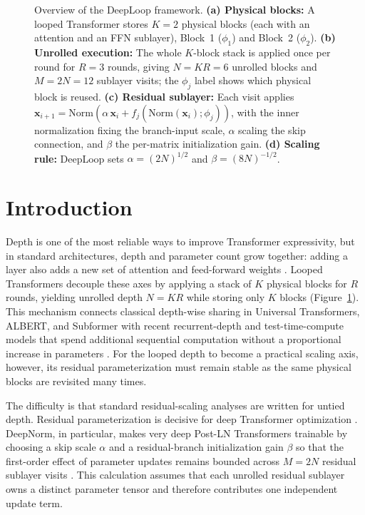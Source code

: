 \documentclass[11pt]{airesearch}
\begin{document}
\begin{figure}[t]
  \centering
  
  \caption{Overview of the DeepLoop framework.
    \textbf{(a) Physical blocks:} A looped Transformer stores $K{=}2$
    physical blocks (each with an attention and an FFN sublayer),
    Block~1 ($\phi_1$) and Block~2 ($\phi_2$).
    \textbf{(b) Unrolled execution:} The whole $K$-block stack is applied
    once per round for $R{=}3$ rounds, giving $N{=}KR{=}6$ unrolled
    blocks and $M{=}2N{=}12$ sublayer visits; the $\phi_j$ label shows
    which physical block is reused.
    \textbf{(c) Residual sublayer:} Each visit applies
    $\mathbf{x}_{i+1}{=}\mathrm{Norm}(\alpha\,\mathbf{x}_i
    + f_j(\mathrm{Norm}(\mathbf{x}_i);\phi_j))$, with the inner
    normalization fixing the branch-input scale, $\alpha$ scaling the skip
    connection, and $\beta$ the per-matrix initialization gain.
    \textbf{(d) Scaling rule:} DeepLoop sets $\alpha{=}(2N)^{1/2}$ and
    $\beta{=}(8N)^{-1/2}$.}
  \label{fig:deeploop-overview}
\end{figure}

\section{Introduction}

Depth is one of the most reliable ways to improve Transformer expressivity, but in standard architectures, depth and parameter count grow together: adding a layer also adds a new set of attention and feed-forward weights
\citep{vaswani2017attention,kaplan2020scaling,hoffmann2022training}. Looped
Transformers decouple these axes by applying a stack of $K$ physical blocks for
$R$ rounds, yielding unrolled depth $N=KR$ while storing only $K$ blocks
(Figure~\ref{fig:deeploop-overview}). This mechanism connects classical depth-wise sharing in Universal Transformers,
ALBERT, and Subformer \citep{dehghani2018universal,lan2019albert,reid2021subformer}
with recent recurrent-depth and test-time-compute models that spend additional
sequential computation without a proportional increase in parameters
\citep{zhu2026scalinglatentreasoninglooped, fu2026discolooploopingdiscreteembeddings, giannou2023looped,yang2023looped,gatmiry2024can,geiping2025scaling,
saunshi2025reasoning}. For the looped depth to become a practical scaling axis, however, its residual parameterization must remain stable as the same physical blocks are revisited many times.

The difficulty is that standard residual-scaling analyses are written for
untied depth. Residual parameterization is decisive for deep Transformer
optimization \citep{xiong2020layer,nguyen2019transformers,liu2020understanding,
huang2020improving,bachlechner2021rezero,wang2024deepnet}. DeepNorm, in
particular, makes very deep Post-LN Transformers trainable by choosing a skip
scale $\alpha$ and a residual-branch initialization gain $\beta$ so that the
first-order effect of parameter updates remains bounded across $M=2N$ residual
sublayer visits \citep{wang2024deepnet}. This calculation assumes that each
unrolled residual sublayer owns a distinct parameter tensor and therefore
contributes one independent update term.
\end{document}
